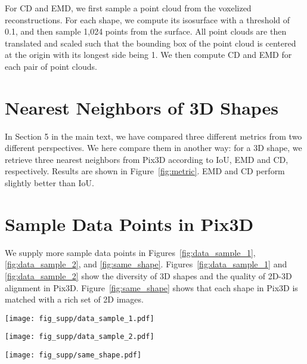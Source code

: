\documentclass[10pt,twocolumn,letterpaper]{article}
\newcommand{\fig}[1]{Figure~\ref{#1}}
\newcommand{\figs}[1]{Figures~\ref{#1}}
\newcommand{\data}{Pix3D\xspace}
\begin{document}
For CD and EMD, we first sample a point cloud from the voxelized reconstructions. For each shape, we compute its isosurface with a threshold of 0.1, and then sample 1,024 points from the surface. All point clouds are then translated and scaled such that the bounding box of the point cloud is centered at the origin with its longest side being 1. We then compute CD and EMD for each pair of point clouds. 
 \section{Nearest Neighbors of 3D Shapes}
\label{sec:metric}

In Section 5 in the main text, we have compared three different metrics from two different perspectives. We here compare them in another way: for a 3D shape, we retrieve three nearest neighbors from \data according to IoU, EMD and CD, respectively. Results are shown in \fig{fig:metric}. EMD and CD perform slightly better than IoU.

 \section{Sample Data Points in \data}
\label{sec:data}

We supply more sample data points in \figs{fig:data_sample_1}, \ref{fig:data_sample_2}, and \ref{fig:same_shape}. \figs{fig:data_sample_1} and \ref{fig:data_sample_2} show the diversity of 3D shapes and the quality of 2D-3D alignment in \data. \fig{fig:same_shape} shows that each shape in \data is matched with a rich set of 2D images.

\begin{figure*}[p]
\centering
\vspace{-12pt}
\texttt{[image: fig\_supp/data\_sample\_1.pdf]}
\caption{Sample images and corresponding shapes in \data. From left to right: 3D shapes, 2D images, 2D-3D alignment. The  and  rows are beds, the  and  rows are book selves, the  and  rows are scanned chairs, the  and  rows are chairs whose 3D shapes come from IKEA~\cite{Lim2013Parsing}, and the  and  rows are desks.}
\label{fig:data_sample_1}
\end{figure*}

\begin{figure*}[p]
\centering
\vspace{-7pt}
\texttt{[image: fig\_supp/data\_sample\_2.pdf]}
\caption{Sample images and corresponding shapes in \data. From left to right: 3D shapes, 2D image, 2D-3D alignment. The  and  rows are miscellaneous objects, the  and  rows are sofas, the  and  rows are tables, the  and  rows are tools, and the  and  rows are wardrobes.}
\label{fig:data_sample_2}
\end{figure*}

\begin{figure*}[t]
\centering
\texttt{[image: fig\_supp/same\_shape.pdf]}
\caption{Sample images and corresponding shapes in \data. The two 3D shapes are each associated with a diverse set of 2D images.}
\label{fig:same_shape}
\end{figure*}


  
\end{document}
